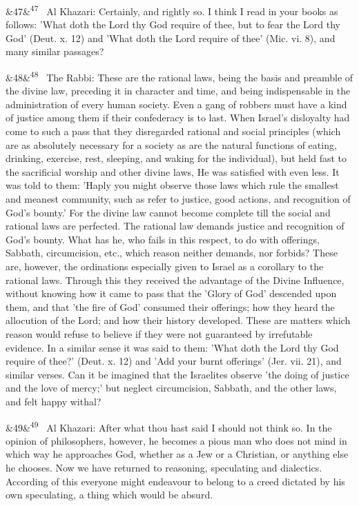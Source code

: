 \documentclass[12pt]{article}
\newcommand{\para}[1][]{\par\noindent\ifx&#1&\else\textsuperscript{\footnotesize #1}~\fi}
\begin{document}
\para[47] Al Khazari: Certainly, and rightly so. I think I read in your books as follows: 'What doth the Lord thy God require of thee, but to fear the Lord thy God' (Deut. x. 12) and 'What doth the Lord require of thee' (Mic. vi. 8), and many similar passages?

\para[48] The Rabbi: These are the rational laws, being the basis and preamble of the divine law, preceding it in character and time, and being indispensable in the administration of every human society. Even a gang of robbers must have a kind of justice among them if their confederacy is to last. When Israel's disloyalty had come to such a pass that they disregarded rational and social principles (which are as absolutely necessary for a society as are the natural functions of eating, drinking, exercise, rest, sleeping, and waking for the individual), but held fast to the sacrificial worship and other divine laws, He was satisfied with even less. It was told to them: 'Haply you might observe those laws which rule the smallest and meanest community, such as refer to justice, good actions, and recognition of God's bounty.' For the divine law cannot become complete till the social and rational laws are perfected. The rational law demands justice and recognition of God's bounty. What has he, who fails in this respect, to do with offerings, Sabbath, circumcision, etc., which reason neither demands, nor forbids? These are, however, the ordinations especially given to Israel as a corollary to the rational laws. Through this they received the advantage of the Divine Influence, without knowing how it came to pass that the 'Glory of God' descended upon them, and that 'the fire of God' consumed their offerings; how they heard the allocution of the Lord; and how their history developed. These are matters which reason would refuse to believe if they were not guaranteed by irrefutable evidence. In a similar sense it was said to them: 'What doth the Lord thy God require of thee?' (Deut. x. 12) and 'Add your burnt offerings' (Jer. vii. 21), and similar verses. Can it be imagined that the Israelites observe 'the doing of justice and the love of mercy;' but neglect circumcision, Sabbath, and the other laws, and felt happy withal?

\para[49] Al Khazari: After what thou hast said I should not think so. In the opinion of philosophers, however, he becomes a pious man who does not mind in which way he approaches God, whether as a Jew or a Christian, or anything else he chooses. Now we have returned to reasoning, speculating and dialectics. According of this everyone might endeavour to belong to a creed dictated by his own speculating, a thing which would be absurd.
\end{document}
